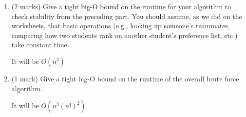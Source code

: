 \documentclass[11pt]{article}
\begin{document}
\begin{enumerate}
\begin{soln}
\begin{algorithmic}[1]
     
        \State \Return $M$
        \EndIf
     \EndFor  
     
     \Return "No stable matching"
\EndProcedure



        \State $\triangleright$ $M$ is a perfect matching
        \State $\triangleright$ return true if M is a stable matching in the instance ($n, P_b, P_c, P_d$)
        \State $\triangleright$ The if statements inside the loop are only split up to comply with $\LaTeX$ formatting
                        \State find b s.t. $(b,c,d) \in M$
                        \State find c' s.t. $(b,c,d) \in M$
                        \State find d'' s.t. $(b,c,d) \in M$
                        
                            \State \Return false
                            \EndIf
                        \EndIf
                    \EndIf
                \EndFor 
            \EndFor
        \EndFor
        \Return true
    \EndFunction

\end{algorithmic}


\end{soln}


\item (2 marks)
Give a tight big-O bound on the runtime
for your algorithm to check stability from the preceding part.
You should assume, as we did on the worksheets, that basic operations
(e.g., looking up someone's teammates, comparing how two students rank
on another student's preference list, etc.) take constant time.

\begin{soln}
    It will be $O(n^3)$    
\end{soln}

\item (1 mark)
Give a tight big-O bound on the runtime of the overall brute force
algorithm.

\begin{soln}
     It will be $O(n^3 (n!)^2)$
\end{soln}


\end{enumerate}
\end{document}
